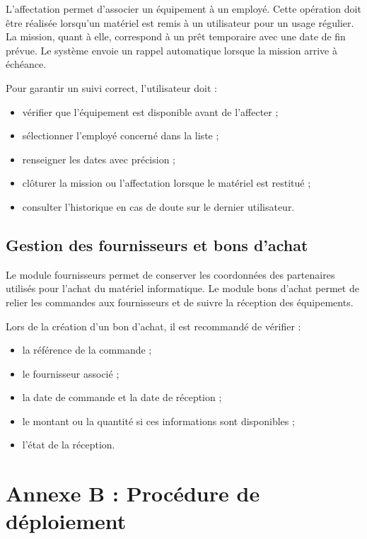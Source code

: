 L'affectation permet d'associer un équipement à un employé. Cette opération doit être réalisée lorsqu'un matériel est remis à un utilisateur pour un usage régulier. La mission, quant à elle, correspond à un prêt temporaire avec une date de fin prévue. Le système envoie un rappel automatique lorsque la mission arrive à échéance.

Pour garantir un suivi correct, l'utilisateur doit :

\begin{itemize}[label=\textbullet,font=\normalsize]
    \item vérifier que l'équipement est disponible avant de l'affecter ;
    \item sélectionner l'employé concerné dans la liste ;
    \item renseigner les dates avec précision ;
    \item clôturer la mission ou l'affectation lorsque le matériel est restitué ;
    \item consulter l'historique en cas de doute sur le dernier utilisateur.
\end{itemize}

\subsection*{Gestion des fournisseurs et bons d'achat}

Le module fournisseurs permet de conserver les coordonnées des partenaires utilisés pour l'achat du matériel informatique. Le module bons d'achat permet de relier les commandes aux fournisseurs et de suivre la réception des équipements.

Lors de la création d'un bon d'achat, il est recommandé de vérifier :

\begin{itemize}[label=\textbullet,font=\normalsize]
    \item la référence de la commande ;
    \item le fournisseur associé ;
    \item la date de commande et la date de réception ;
    \item le montant ou la quantité si ces informations sont disponibles ;
    \item l'état de la réception.
\end{itemize}

\section*{Annexe B : Procédure de déploiement}

